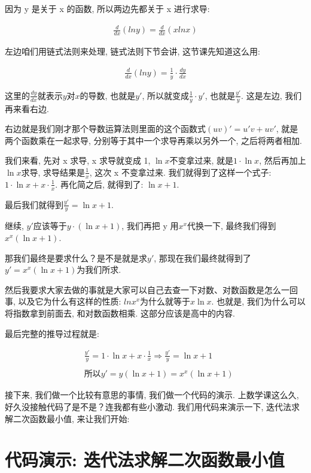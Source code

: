 因为 y 是关于 x 的函数, 所以两边先都关于 x 进行求导:

\begin{align*}
  \frac{d}{dx}(lny) = \frac{d}{dx}(xlnx) 
\end{align*}

左边咱们用链式法则来处理, 链式法则下节会讲, 这节课先知道这么用:

\begin{align*}
  \frac{d}{dx}(lny) = \frac{1}{y} \cdot \frac{dy}{dx} 
\end{align*}

这里的$\frac{dy}{dx}$就表示$y$对$x$的导数, 也就是$y'$, 所以就变成$\frac{1}{y} \cdot y'$, 也就是$\frac{y'}{y}$. 这是左边, 我们再来看右边. 

右边就是我们刚才那个导数运算法则里面的这个函数式$(uv)' = u'v+uv'$, 就是两个函数乘在一起求导, 分别等于其中一个求导再乘以另外一个, 之后将两者相加. 

我们来看, 先对 x 求导, x 求导就变成 1, $\ln x$不变拿过来, 就是$1 \cdot \ln x$, 然后再加上$\ln x$求导, 求导结果是$\frac{1}{x}$,  这次 x 不变拿过来. 我们就得到了这样一个式子: $1 \cdot \ln x + x \cdot \frac{1}{x}$. 再化简之后, 就得到了: $\ln x + 1$. 

最后我们就得到$\frac{y'}{y} = \ln x + 1$. 

继续, $y'$应该等于$y \cdot (\ln x + 1)$, 我们再把 y 用$x^x$代换一下, 最终我们得到$x^x(\ln x + 1)$. 

那我们最终是要求什么？是不是就是求$y'$, 那现在我们最终就得到了$y' = x^x(\ln x + 1)$为我们所求.

然后我要求大家去做的事就是大家可以自己去查一下对数、对数函数是怎么一回事, 以及它为什么有这样的性质: $ln x ^x$为什么就等于$x \ln x$. 也就是, 我们为什么可以将指数拿到前面去, 和对数函数相乘. 这部分应该是高中的内容. 

最后完整的推导过程就是: 

\begin{align*}
  & \frac{y'}{y} = 1 \cdot \ln x + x \cdot \frac{1}{x} \Rightarrow \frac{y'}{y} = \ln x + 1 \\ \\
  & \mbox{所以} y' = y(\ln x + 1) = x^x(\ln x + 1)
\end{align*}

接下来, 我们做一个比较有意思的事情, 我们做一个代码的演示. 上数学课这么久, 好久没接触代码了是不是？连我都有些小激动. 我们用代码来演示一下, 迭代法求解二次函数最小值, 来让我们开始: 

\section{代码演示: 迭代法求解二次函数最小值}

